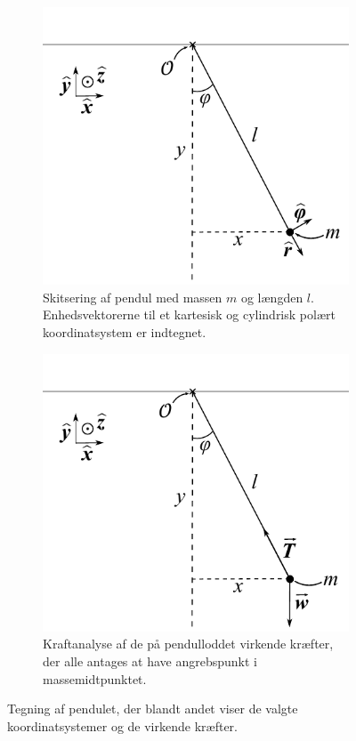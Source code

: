 \begin{figure}[t]
\centering
\begin{subfigure}{.45\textwidth}
  \centering
  \includegraphics[width=\linewidth]{Analytisk-Mekanik/Pendul.pdf}
\caption{Skitsering af pendul med massen $m$ og længden $l$. Enhedsvektorerne til et kartesisk og cylindrisk polært koordinatsystem er indtegnet.}
\label{fig:Pendul}
\end{subfigure}
\hspace{5mm}
\begin{subfigure}{.45\textwidth}
  \centering
  \includegraphics[width=\linewidth]{Analytisk-Mekanik/PendulKraft.pdf}
  \caption{Kraftanalyse af de på pendulloddet virkende kræfter, der alle antages at have angrebspunkt i massemidtpunktet.}
  \label{fig:Kraftanalyse}
\end{subfigure}
\caption{Tegning af pendulet, der blandt andet viser de valgte koordinatsystemer og de virkende kræfter.}
\end{figure}


